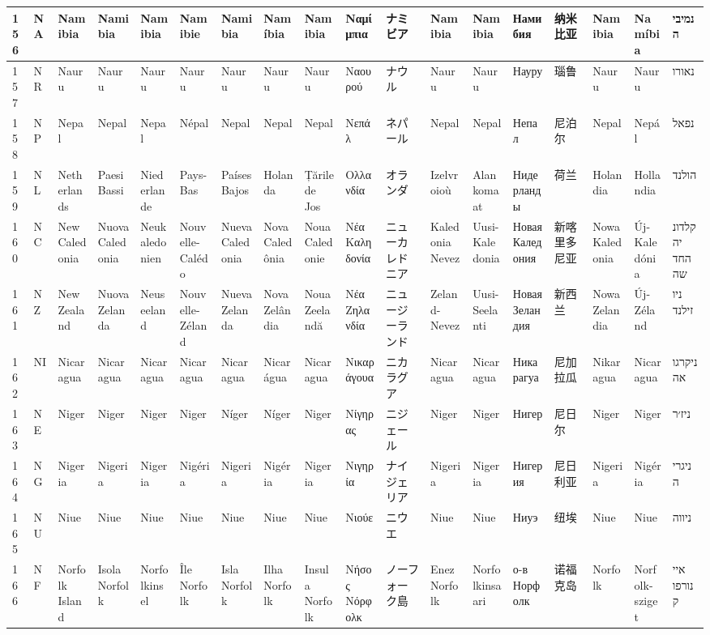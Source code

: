 \begin{longtable}{|l|l|l|l|l|l|l|l|l|l|l|l|l|l|l|l|l|l|}
156 & NA & Namibia & Namibia & Namibia & Namibie & Namibia & Namíbia & Namibia & Ναμίμπια & ナミビア & Namibia & Namibia & Намибия & 纳米比亚 & Namibia & Namíbia & נמיביה \\ \hline 
157 & NR & Nauru & Nauru & Nauru & Nauru & Nauru & Nauru & Nauru & Ναουρού & ナウル & Nauru & Nauru & Науру & 瑙鲁 & Nauru & Nauru & נאורו \\ \hline 
158 & NP & Nepal & Nepal & Nepal & Népal & Nepal & Nepal & Nepal & Νεπάλ & ネパール & Nepal & Nepal & Непал & 尼泊尔 & Nepal & Nepál & נפאל \\ \hline 
159 & NL & Netherlands & Paesi Bassi & Niederlande & Pays-Bas & Países Bajos & Holanda & Țările de Jos & Ολλανδία & オランダ & Izelvroioù & Alankomaat & Нидерланды & 荷兰 & Holandia & Hollandia & הולנד \\ \hline 
160 & NC & New Caledonia & Nuova Caledonia & Neukaledonien & Nouvelle-Calédo & Nueva Caledonia & Nova Caledônia & Noua Caledonie & Νέα Καληδονία & ニューカレドニア & Kaledonia Nevez & Uusi-Kaledonia & Новая Каледония & 新喀里多尼亚 & Nowa Kaledonia & Új-Kaledónia & קלדוניה החדשה \\ \hline 
161 & NZ & New Zealand & Nuova Zelanda & Neuseeland & Nouvelle-Zéland & Nueva Zelanda & Nova Zelândia & Noua Zeelandă & Νέα Ζηλανδία & ニュージーランド & Zeland-Nevez & Uusi-Seelanti & Новая Зеландия & 新西兰 & Nowa Zelandia & Új-Zéland & ניו זילנד \\ \hline 
162 & NI & Nicaragua & Nicaragua & Nicaragua & Nicaragua & Nicaragua & Nicarágua & Nicaragua & Νικαράγουα & ニカラグア & Nicaragua & Nicaragua & Никарагуа & 尼加拉瓜 & Nikaragua & Nicaragua & ניקרגואה \\ \hline 
163 & NE & Niger & Niger & Niger & Niger & Níger & Níger & Niger & Νίγηρας & ニジェール & Niger & Niger & Нигер & 尼日尔 & Niger & Niger & ניז׳ר \\ \hline 
164 & NG & Nigeria & Nigeria & Nigeria & Nigéria & Nigeria & Nigéria & Nigeria & Νιγηρία & ナイジェリア & Nigeria & Nigeria & Нигерия & 尼日利亚 & Nigeria & Nigéria & ניגריה \\ \hline 
165 & NU & Niue & Niue & Niue & Niue & Niue & Niue & Niue & Νιούε & ニウエ & Niue & Niue & Ниуэ & 纽埃 & Niue & Niue & ניווה \\ \hline 
166 & NF & Norfolk Island & Isola Norfolk & Norfolkinsel & Île Norfolk & Isla Norfolk & Ilha Norfolk & Insula Norfolk & Νήσος Νόρφολκ & ノーフォーク島 & Enez Norfolk & Norfolkinsaari & о-в Норфолк & 诺福克岛 & Norfolk & Norfolk-sziget & איי נורפוק \\ \hline 

\end{longtable}

